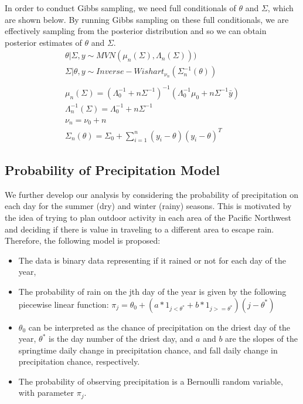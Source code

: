 \documentclass{article}
\begin{document}
In order to conduct Gibbs sampling, we need full conditionals of $\theta$ and $\Sigma$, which are shown below. By running Gibbs sampling on these full conditionals, we are effectively sampling from the posterior distribution and so we can obtain posterior estimates of $\theta$ and $\Sigma$.
\begin{align}
\theta | \Sigma, y \sim MVN(\mu_n(\Sigma), \Lambda_n(\Sigma)))  \nonumber \\
\Sigma | \theta, y \sim Inverse - Wishart_{\nu_n} (\Sigma_n^{-1}(\theta)) \nonumber \\
\nonumber \\
\mu_n(\Sigma) =(\Lambda_0^{-1} + n\Sigma^{-1})^{-1}(\Lambda_0^{-1}\mu_0 + n\Sigma^{-1}\bar{y}) \nonumber \\
\Lambda_n^{-1}(\Sigma) = \Lambda_0^{-1} + n\Sigma^{-1} \nonumber \\
\nu_n = \nu_0 + n \nonumber \\
\Sigma_n(\theta) = \Sigma_0 + \sum_{i=1}^n(y_i - \theta)(y_i - \theta)^T \nonumber
\end{align}

\subsection{Probability of Precipitation Model}

We further develop our analysis by considering the probability of precipitation on each day for the summer (dry) and winter (rainy) seasons. This is motivated by the idea of trying to plan outdoor activity in each area of the Pacific Northwest and deciding if there is value in traveling to a different area to escape rain.
Therefore, the following model is proposed:
\begin{itemize}
\item The data is binary data representing if it rained or not for each day of the year,
\item The probability of rain on the jth day of the year is given by the following piecewise linear function: $\pi_j = \theta_0 + (a * 1_{j < \theta^*} + b*1_{j>=\theta^*})(j - \theta^*)$
\item $\theta_0$ can be interpreted as the chance of precipitation on the driest day of the year, $\theta^*$ is the day number of the driest day, and $a$ and $b$ are the slopes of the springtime daily change in precipitation chance, and fall daily change in precipitation chance, respectively.
\item The probability of observing precipitation is a Bernoulli random variable, with parameter $\pi_j$.
\end{itemize}
\end{document}
